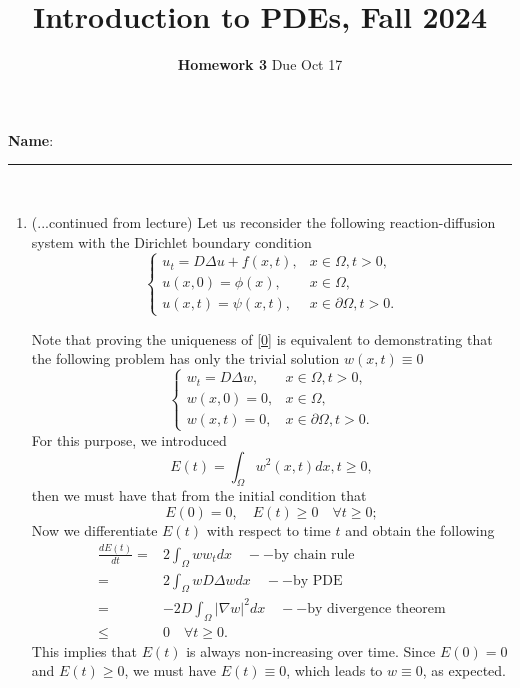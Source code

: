 \documentclass[6pt]{article}
\title{Introduction to PDEs, Fall 2024}
\author{\textbf{Homework 3} Due Oct 17}
\date{}
\numberwithin{equation}{section}
\begin{document}
\maketitle

\textbf{Name}:\rule{1 in}{0.001 in} \\
\begin{enumerate}

\item[] 
(...continued from lecture)  Let us reconsider the following reaction-diffusion system with the Dirichlet boundary condition
\begin{equation}\label{0}
\left\{
\begin{array}{ll}
u_t=D\Delta u+f(x,t),&x\in \Omega,t>0,\\
u(x,0)=\phi(x),&x\in \Omega,\\
u(x,t)=\psi(x,t),&x \in \partial \Omega, t>0.
\end{array}
\right.
\end{equation}

Note that proving the uniqueness of \eqref{0} is equivalent to demonstrating that the following problem has only the trivial solution \( w(x,t) \equiv 0 \)
\begin{equation}\label{00}
\left\{
\begin{array}{ll}
w_t=D\Delta w,&x\in \Omega,t>0,\\
w(x,0)=0,&x\in \Omega,\\
w(x,t)=0,&x \in \partial \Omega, t>0.
\end{array}
\right.
\end{equation}
For this purpose, we introduced 
\[E(t)=\int_\Omega w^2(x,t)dx, t\geq0, \]
then we must have that from the initial condition that
\[E(0)=0,\quad E(t)\geq 0 \quad \forall t\geq 0;\]
Now we differentiate \( E(t) \) with respect to time \( t \) and obtain the following
\begin{align}
    \frac{dE(t)}{dt}  = & 2\int_\Omega w w_tdx  \quad --\text{by chain rule} \nonumber \\
    =& 2\int _\Omega wD\Delta w dx \quad --\text{by PDE} \nonumber \\
    =& -2 D \int_\Omega  |\nabla w|^2dx \quad --\text{by divergence theorem} \label{dv}\\
    \leq & 0 \quad \forall t\geq0. \nonumber   
\end{align}
This implies that \( E(t) \) is always non-increasing over time. Since \( E(0) = 0 \) and \( E(t) \geq 0 \), we must have \( E(t) \equiv 0 \), which leads to \( w \equiv 0 \), as expected.


\end{enumerate}
\end{document}
